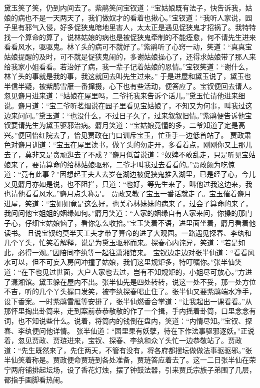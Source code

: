 \documentclass[12pt,oneside]{book}
\begin{document}
黛玉笑了笑，仍到内间去了。紫鹃笑问宝钗道：“宝姑娘既有法子，快告诉我，姑娘的病也不是一天两天了，我们做奴才的看着也揪心。”宝钗道：“我听人家说，园子里有邪气入侵，好多促狭鬼暗地里害人，太太正是遇见促狭鬼才招祸了。我特特找一个算命的算了，说林姑娘的病也是被促狭鬼牵制的不能痊愈，何不请先生进来看看风水，驱驱鬼。林丫头的病可不就好了。”紫鹃听了心窍一动，笑道：“真真宝姑娘提醒的及时，可不就是促狭鬼闹的，多谢姑娘操心了，还得求姑娘带了那人来给我家小姐看看。若治好了病，我一辈子记着姑娘的恩情。”宝钗笑道：“谢什么，林丫头的事就是我的事，我这就回去叫先生过来。”
于是进屋和黛玉说了，黛玉也半信半疑，被紫鹃雪雁一番撺掇，心下也有些活动，便答应了。宝钗便回去请人。忽见麝月进来道：“姑娘在屋里吗，二爷托我来告诉个话儿。”黛玉忙请他进来细说。麝月道：“宝二爷听茗烟说在园子里看见宝姑娘了，不知又为何事，叫我过这边来问问。”黛玉道：“也没什么，不过日子久了，过来叙叙旧情。”紫鹃便告诉他宝钗要请先生为黛玉驱邪治病。麝月笑道：“宝姑娘竟懂的多，二爷知道了定是高兴。”便回怡红院去了，恰见贾政在门口训斥宝玉，忙垂手一边低首站了。
贾政肃色对麝月训道：“宝玉在屋里读书，做丫头的勿走开，多看着点，刚刚你又上那儿去了，莫非又是贪顽逛去了不成？”麝月低首说道：“奴婢不敢乱走，只是听见宝姑娘来了，要请算命的给林姑娘驱邪，二爷才叫我过去看看的。”贾政颇为吃惊道：“竟有此事？”因想起王夫人去岁在湖边被促狭鬼推入湖里，已是经了心，今儿又见麝月亦如是说，也不阻拦，只道：“也好，等先生来了，叫他过我这边来，我也请他看看风水。”麝月点头称是。
贾政又教了宝玉一番话就走了。宝玉催着麝月进屋，笑道：“宝姐姐竟是这么好，也关心林妹妹的病来了，过会子算命的来了，我问问他宝姐姐的姻缘如何。”麝月笑道：“人家的姻缘自有人家来问，你操的那门子心，仔细宝姑娘恼了，看你怎么收拾。”宝玉笑着不语，进里面坐着，麝月看着他读书。
且说宝钗约莫半天工夫才带了算命的进了大观园。一路遇见探春、李纨和几个丫头，忙笑着解释，说是为黛玉驱邪而来。探春心内诧异，笑道：“若是如此，必得一观。”因陪同李纨等一起往潇湘馆来。
宝钗边走边对张半仙道：“看看风水可以，但不可妄入房间冲撞了姑娘，我们这里规矩多，特叮嘱你。”张半仙笑道：“在下也见过世面，大户人家也去过，岂有不知规矩的，小姐尽可放心。”方进了潇湘馆。黛玉躲在屋内不出。张半仙先是四处转转，说这一处不妥，那一处方位不吉，听的几个丫头握口发笑，被李纨探春喝止住了。张半仙又要紫鹃端水净手，设下香案。一时紫鹃雪雁等安排了，张半仙燃香合掌道：“让我起出一课看看。”从那怀里掏出卦筒来，走到案前恭恭敬敬的作了一个揖，手内摇着卦筒，口里念念有词，也不知说些什么。说着，将筒内的钱倒在盘内，笑道：“内情尽知。”宝钗、探春、李纨便问他详情。
张半仙道：“园里果有妖孽，待在下作法事驱邪逐妖。”正说着，忽见贾政、贾琏进来，宝钗、探春、李纨和众丫头忙一边恭敬站了。贾政道：“先生既然来了，先住两天，不管有没有，将各府都摆坛做做法事驱驱邪。”张半仙笑着称是。贾政便命贾琏到各处准备，贾琏答应着去了。这一二日张半仙在荣宁两府铺排起坛场，设了香花灯烛，摆了钟鼓法器，引来贾氏宗族子弟围了几层，都指手画脚看热闹。
\end{document}
